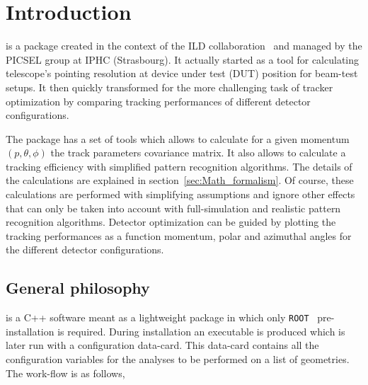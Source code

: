 \section{Introduction}
\label{sec:Intro}

{\guari} is a package created in the context of the ILD collaboration~\cite{bib:ILDcoll} and managed by the PICSEL group at IPHC (Strasbourg).
It actually started as a tool for calculating telescope's pointing resolution at device under test (DUT) position for beam-test setups. It then quickly 
transformed for the more challenging task of tracker optimization by comparing tracking performances of different detector configurations.

The package has a set of tools which allows to calculate for a given momentum $(p,\theta,\phi)$ the track parameters covariance matrix. It also allows to 
calculate a tracking efficiency with simplified pattern recognition algorithms. The details of the calculations are explained in section~\ref{sec:Math_formalism}.
Of course, these calculations are performed with simplifying assumptions and ignore other effects that can only be taken into account with full-simulation 
and realistic pattern recognition algorithms. Detector optimization can be guided by plotting the tracking performances as a function momentum, polar and 
azimuthal angles for the different detector configurations.

\subsection{General philosophy}

{\guari} is a C++ software meant as a lightweight package in which only {\tt ROOT}~\cite{bib:root} pre-installation is required. During installation an executable 
is produced which is later run with a configuration data-card. This data-card contains all the configuration variables for the analyses to be performed on a list of 
geometries. The work-flow is as follows,


